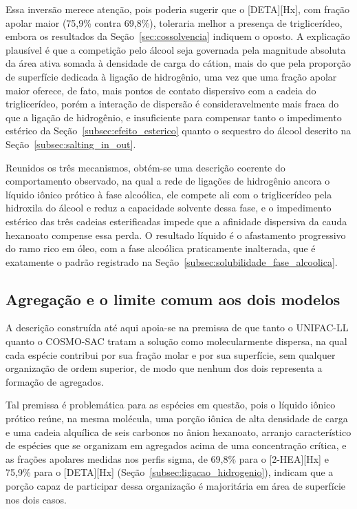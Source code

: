 Essa inversão merece atenção, pois poderia sugerir que o [DETA][Hx], com fração apolar maior (75,9\% contra 69,8\%), toleraria melhor a presença de triglicerídeo, embora os resultados da Seção~\ref{sec:cossolvencia} indiquem o oposto. A explicação plausível é que a competição pelo álcool seja governada pela magnitude absoluta da área ativa somada à densidade de carga do cátion, mais do que pela proporção de superfície dedicada à ligação de hidrogênio, uma vez que uma fração apolar maior oferece, de fato, mais pontos de contato dispersivo com a cadeia do triglicerídeo, porém a interação de dispersão é consideravelmente mais fraca do que a ligação de hidrogênio, e insuficiente para compensar tanto o impedimento estérico da Seção~\ref{subsec:efeito_esterico} quanto o sequestro do álcool descrito na Seção~\ref{subsec:salting_in_out}.

Reunidos os três mecanismos, obtém-se uma descrição coerente do comportamento observado, na qual a rede de ligações de hidrogênio ancora o líquido iônico prótico à fase alcoólica, ele compete ali com o triglicerídeo pela hidroxila do álcool e reduz a capacidade solvente dessa fase, e o impedimento estérico das três cadeias esterificadas impede que a afinidade dispersiva da cauda hexanoato compense essa perda. O resultado líquido é o afastamento progressivo do ramo rico em óleo, com a fase alcoólica praticamente inalterada, que é exatamente o padrão registrado na Seção~\ref{subsec:solubilidade_fase_alcoolica}.

\subsection{Agregação e o limite comum aos dois modelos}
\label{subsec:agregacao}

A descrição construída até aqui apoia-se na premissa de que tanto o UNIFAC-LL quanto o COSMO-SAC tratam a solução como molecularmente dispersa, na qual cada espécie contribui por sua fração molar e por sua superfície, sem qualquer organização de ordem superior, de modo que nenhum dos dois representa a formação de agregados.

Tal premissa é problemática para as espécies em questão, pois o líquido iônico prótico reúne, na mesma molécula, uma porção iônica de alta densidade de carga e uma cadeia alquílica de seis carbonos no ânion hexanoato, arranjo característico de espécies que se organizam em agregados acima de uma concentração crítica, e as frações apolares medidas nos perfis sigma, de 69,8\% para o [2-HEA][Hx] e 75,9\% para o [DETA][Hx] (Seção~\ref{subsec:ligacao_hidrogenio}), indicam que a porção capaz de participar dessa organização é majoritária em área de superfície nos dois casos.


